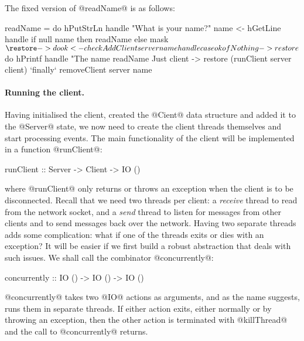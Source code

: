 The fixed version of @readName@ is as follows:

\begin{haskell}
    readName = do
      hPutStrLn handle "What is your name?"
      name <- hGetLine handle
      if null name
         then readName
         else mask $ \restore -> do
                ok <- checkAddClient server name handle
                case ok of
                  Nothing -> restore $ do
                     hPrintf handle
                        "The name %
                     readName
                  Just client ->
                     restore (runClient server client)
                       `finally` removeClient server name
\end{haskell}

\paragraph{Running the client.} Having initialised the client, created
the @Cient@ data structure and added it to the @Server@ state, we now
need to create the client threads themselves and start processing
events.  The main functionality of the client will be implemented in a
function @runClient@:

\begin{haskell}
runClient :: Server -> Client -> IO ()
\end{haskell}

\noindent where @runClient@ only returns or throws an exception when
the client is to be disconnected.  Recall that we need two threads per
client: a \emph{receive} thread to read from the network socket, and a
\emph{send} thread to listen for messages from other clients and to
send messages back over the network.  Having two separate threads adds
some complication: what if one of the threads exits or dies with an
exception?  It will be easier if we first build a robust abstraction
that deals with such issues.  We shall call the combinator
@concurrently@:

\begin{haskell}
concurrently :: IO () -> IO () -> IO ()
\end{haskell}

\noindent @concurrently@ takes two @IO@ actions as arguments, and as
the name suggests, runs them in separate threads.  If either action
exits, either normally or by throwing an exception, then the other
action is terminated with @killThread@ and the call to @concurrently@
returns.


